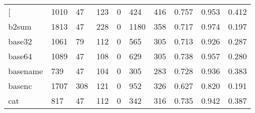 \begin{longtable}{lp{1.3cm}p{1.3cm}p{1.3cm}p{1.3cm}p{1.3cm}p{1.3cm}p{1.3cm}p{1.3cm}p{1.3cm}}
\bottomrule
\endlastfoot
{[}         &                   1010 &                                 47 &                               123 &                                0 &                               424 &                             416 &                                0.757 &                                  0.953 &                                0.412 \\
b2sum     &                   1813 &                                 47 &                               228 &                                0 &                              1180 &                             358 &                                0.717 &                                  0.974 &                                0.197 \\
base32    &                   1061 &                                 79 &                               112 &                                0 &                               565 &                             305 &                                0.713 &                                  0.926 &                                0.287 \\
base64    &                   1089 &                                 47 &                               108 &                                0 &                               629 &                             305 &                                0.738 &                                  0.957 &                                0.280 \\
basename  &                    739 &                                 47 &                               104 &                                0 &                               305 &                             283 &                                0.728 &                                  0.936 &                                0.383 \\
basenc    &                   1707 &                                308 &                               121 &                                0 &                               952 &                             326 &                                0.627 &                                  0.820 &                                0.191 \\
cat       &                    817 &                                 47 &                               112 &                                0 &                               342 &                             316 &                                0.735 &                                  0.942 &                                0.387 \\

\end{longtable}
